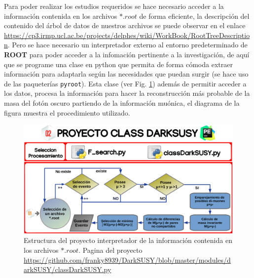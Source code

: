 Para poder realizar los estudios requeridos se hace necesario acceder a la información contenida en los archivos $*.root$ de forma eficiente, la descripción del contenido del árbol de datos de nuestros archivos se puede observar en el enlace \url{https://cp3.irmp.ucl.ac.be/projects/delphes/wiki/WorkBook/RootTreeDescription}. Pero se hace necesario un interpretador externo al entorno predeterminado de \textbf{ROOT} para poder acceder a la infomación pertinente a la investigación, de aquí que se programe una clase en python que permita de forma cómoda extraer información para adaptarla según las necesidades que puedan surgir (se hace uso de las paqueterías \texttt{pyroot}). Esta clase (ver Fig. \ref{class_darksusy1}) además de permitir acceder a los datos, procesa la información para hacer la reconstrucción más probable de la masa del fotón oscuro partiendo de la información muónica, el diagrama de la figura muestra el procedimiento utilizado.

\begin{figure}[h]
\centering
\includegraphics[width=.9\textwidth]{Simulacion/imagenes/class_darksusy.png}
\caption{Estructura del proyecto interpretador de la información contenida en los archivos $*.root$. Pagina del proyecto \url{https://github.com/franky8939/DarkSUSY/blob/master/modules/darkSUSY/classDarkSUSY.py}}
\label{class_darksusy1}
\end{figure}

